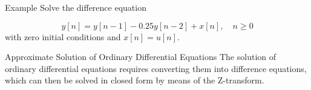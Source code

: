\documentclass[aspectratio=169,xcolor=dvipsnames,svgnames,x11names,fleqn]{beamer}
\begin{document}
\begin{frame}{}
\vspace*{-9\baselineskip}
    \color{LightGray}{Blank space for calculation}
\end{frame}
\begin{frame}{}
\vspace*{-9\baselineskip}
    \color{LightGray}{Blank space for calculation}
\end{frame}
\begin{frame}{}
\vspace*{-9\baselineskip}
    \color{LightGray}{Blank space for calculation}
\end{frame}
\begin{frame}{}
\vspace*{-9\baselineskip}
    \color{LightGray}{Blank space for calculation}
\end{frame}

\begin{frame}{Example}
    Solve the difference equation

    $$
    y[n] = y[n - 1] - 0.25y[n - 2] + x[n], \quad n  \geq 0
    $$
    with zero initial conditions and $x[n] = u[n]$.
    
\end{frame}

\begin{frame}{}
\vspace*{-9\baselineskip}
    \color{LightGray}{Blank space for calculation}
\end{frame}
\begin{frame}{}
\vspace*{-9\baselineskip}
    \color{LightGray}{Blank space for calculation}
\end{frame}
\begin{frame}{}
\vspace*{-9\baselineskip}
    \color{LightGray}{Blank space for calculation}
\end{frame}
\begin{frame}{}
\vspace*{-9\baselineskip}
    \color{LightGray}{Blank space for calculation}
\end{frame}


\begin{frame}{Approximate Solution of Ordinary Differential Equations}
    The solution of ordinary differential equations requires converting them into difference equations,
which can then be solved in closed form by means of the Z-transform.
\end{frame}
\end{document}

